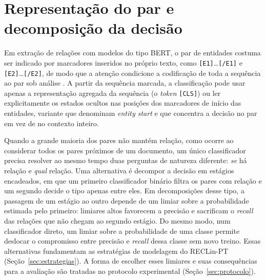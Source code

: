 \section{Representação do par e decomposição da decisão}
\label{sec:ref_par}

Em extração de relações com modelos do tipo BERT, o par de entidades costuma ser
indicado por marcadores inseridos no próprio texto, como
\texttt{[E1]}\ldots\texttt{[/E1]} e \texttt{[E2]}\ldots\texttt{[/E2]}, de modo
que a atenção condicione a codificação de toda a sequência ao par sob análise
\cite{soares_2019_markers}. A partir da sequência marcada, a classificação pode
usar apenas a representação agregada da sequência (o \emph{token} \texttt{[CLS]})
ou ler explicitamente os estados ocultos nas posições dos marcadores de início das
entidades, variante que  denominam \emph{entity
start} e que concentra a decisão no par em vez de no contexto inteiro.

Quando a grande maioria dos pares não mantém relação, como ocorre ao considerar
todos os pares próximos de um documento, um único classificador precisa resolver
ao mesmo tempo duas perguntas de natureza diferente: \emph{se} há relação e
\emph{qual} relação. Uma alternativa é decompor a decisão em estágios encadeados,
em que um primeiro classificador binário filtra os pares com relação e um segundo
decide o tipo apenas entre eles. Em decomposições desse tipo, a passagem de um
estágio ao outro depende de um limiar sobre a probabilidade estimada pelo
primeiro: limiares altos favorecem a precisão e sacrificam o \emph{recall} das
relações que não chegam ao segundo estágio. Do mesmo modo, num classificador
direto, um limiar sobre a probabilidade de uma classe permite deslocar o
compromisso entre precisão e \emph{recall} dessa classe sem novo treino. Essas
alternativas fundamentam as estratégias de modelagem do RECLin-PT
(Seção~\ref{sec:estrategias}). A forma de
escolher esses limiares e suas consequências para a avaliação são tratadas no
protocolo experimental (Seção~\ref{sec:protocolo}).
